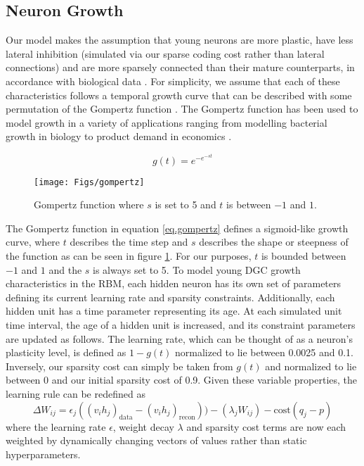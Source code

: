 \subsection{Neuron Growth}

Our model makes the assumption that young neurons are more plastic, have less lateral  
inhibition (simulated via our sparse coding cost rather than lateral connections) 
and are more sparsely
connected than their mature 
counterparts, in accordance with biological data
\citep{enhanced_synaptic_plasticity, oswald-et-al-08, marin-burgin-et-al-12, wang-et-al-00}. 
For simplicity, we assume that each of  
these characteristics follows a temporal growth curve that can be described
with some permutation of the Gompertz  
function \citep{gompertz}. 
The Gompertz function has been used to model growth in a variety of applications ranging from 
modelling bacterial growth in biology to product demand in economics \citep{bacterial_growth, economic_growth}. 

\begin{equation}
g(t) = e^{-e^{-st}} \label{eq.gompertz}
\end{equation}

\begin{figure}[!h]
\begin{center}
\texttt{[image: Figs/gompertz]}
\end{center}
\caption{ Gompertz function where $s$ is set to 5 and $t$ is between $-1$ and $1$.}
\label{fig:gompertz}
\end{figure}

The Gompertz function in equation \ref{eq.gompertz} defines a sigmoid-like
growth curve, where $t$ describes the time step and $s$ describes the shape or steepness of the function
as can be seen in figure \ref{fig:gompertz}. 
For our purposes, $t$ is bounded 
between $-1$ and $1$ and the $s$ is always set to 5.
To model young \ac{DGC} growth characteristics in the \ac{RBM},
each hidden neuron has its own set of parameters defining its current learning
rate and sparsity constraints. 
Additionally, each hidden unit has a time parameter representing its age.
At each simulated unit time interval, the age of a hidden unit is increased,
and its constraint parameters are updated as follows. 
The learning rate, which
can be thought of as a neuron's plasticity level, is defined as $1 - g(t)$
normalized to lie between 0.0025 and 0.1. Inversely, our sparsity cost can simply  
be taken from $g(t)$ and normalized to lie between 0 and our initial sparsity
cost of 0.9. 
Given these variable properties,   
the learning rule can be redefined as
\begin{equation}
\Delta W_{ij} = \epsilon_j ((v_{i}h_{j})_{\mathrm{data}} - (v_{i}h_{j})_{\mathrm{recon}})) - (\lambda_jW_{ij}) - \mathrm{cost}(q_j - p) \label{eq.growth}
\end{equation}
where the learning rate $\epsilon$, weight decay $\lambda$ and sparsity cost
terms are now each weighted by dynamically changing vectors of values rather
than static hyperparameters. 

